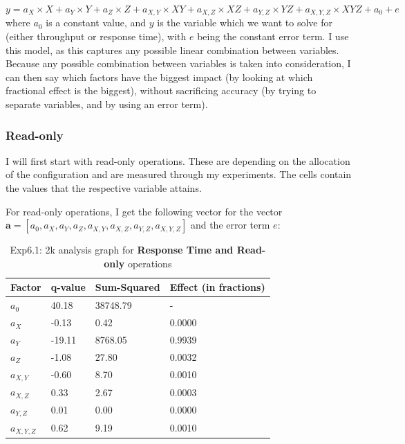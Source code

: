 \documentclass[11pt,a4paper]{article}
\begin{document}
\begin{equation}
	y = a_X \times X + a_Y \times Y + a_Z \times Z + a_{X, Y} \times X Y + a_{X, Z} \times X Z + a_{Y, Z} \times Y Z + a_{X, Y, Z} \times X Y Z + a_0 + e
\end{equation}
where $a_0$ is a constant value, and $y$ is the variable which we want to solve for (either throughput or response time), with $e$ being the constant error term.
I use this model, as this captures any possible linear combination between variables.
Because any possible combination between variables is taken into consideration, I can then say which factors have the biggest impact (by looking at which fractional effect is the biggest), without sacrificing accuracy (by trying to separate variables, and by using an error term).

\subsubsection{Read-only}

I will first start with read-only operations.
These are depending on the allocation of the configuration and are measured through my experiments.
The cells contain the values that the respective variable attains.

For read-only operations, I get the following vector for the vector $\mathbf{a} = 
[a_0, a_X, a_Y, a_Z, a_{X, Y}, a_{X, Z}, a_{Y, Z}, a_{X, Y, Z}] $ and the error term $e$:
\begin{center}
	\begin{table}[H]
	\center
    \begin{tabular}{ | l | l | l | l |  }
    \hline
    Factor & q-value & Sum-Squared & Effect (in fractions) \\ \hline
    $a_0$ & 40.18 & 38748.79 & - \\ \hline
    $a_X$ & -0.13 & 0.42 & 0.0000 \\ \hline
    $a_Y$ & -19.11 & 8768.05 & 0.9939 \\ \hline
    $a_Z$ & -1.08  & 27.80 & 0.0032 \\ \hline
   	$a_{X, Y}$ & -0.60 & 8.70 & 0.0010 \\ \hline
    $a_{X, Z}$ & 0.33 & 2.67 & 0.0003 \\ \hline
    $a_{Y, Z}$ & 0.01 & 0.00 & 0.0000 \\ \hline
    $a_{X, Y, Z}$ & 0.62 & 9.19 & 0.0010 \\
    \hline
    \end{tabular}
  	\caption{Exp6.1: 2k analysis graph for \textbf{Response Time and Read-only} operations}	 
  	\end{table}  
\end{center}
\end{document}
